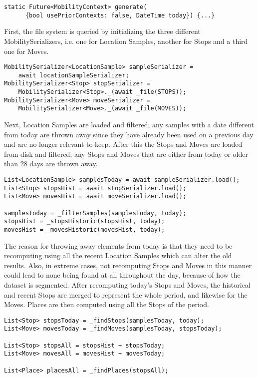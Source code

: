 \begin{verbatim}
static Future<MobilityContext> generate(
      {bool usePriorContexts: false, DateTime today}) {...}
\end{verbatim}

First, the file system is queried by initializing the three different MobilitySerializers, i.e. one for Location Samples, another for Stops and a third one for Moves. 
\begin{verbatim}
MobilitySerializer<LocationSample> sampleSerializer =
    await locationSampleSerializer;
MobilitySerializer<Stop> stopSerializer =
    MobilitySerializer<Stop>._(await _file(STOPS));
MobilitySerializer<Move> moveSerializer =
    MobilitySerializer<Move>._(await _file(MOVES));
\end{verbatim}

Next, Location Samples are loaded and filtered; any samples with a date different from today are thrown away since they have already been used on a previous day and are no longer relevant to keep. After this the Stops and Moves are loaded from disk and filtered; any Stops and Moves that are either from today or older than 28 days are thrown away.

\begin{verbatim}
List<LocationSample> samplesToday = await sampleSerializer.load();
List<Stop> stopsHist = await stopSerializer.load();
List<Move> movesHist = await moveSerializer.load();

samplesToday = _filterSamples(samplesToday, today);
stopsHist = _stopsHistoric(stopsHist, today);
movesHist = _movesHistoric(movesHist, today);
\end{verbatim}

The reason for throwing away elements from today is that they need to be recomputing using all the recent Location Samples which can alter the old results. Also, in extreme cases, not recomputing Stops and Moves in this manner could lead to none being found at all throughout the day, because of how the dataset is segmented. After recomputing today's Stops and Moves, the historical and recent Stops are merged to represent the whole period, and likewise for the Moves. Places are then computed using all the Stops of the period.
\begin{verbatim}
List<Stop> stopsToday = _findStops(samplesToday, today);
List<Move> movesToday = _findMoves(samplesToday, stopsToday);

List<Stop> stopsAll = stopsHist + stopsToday;
List<Move> movesAll = movesHist + movesToday;

List<Place> placesAll = _findPlaces(stopsAll);
\end{verbatim}

